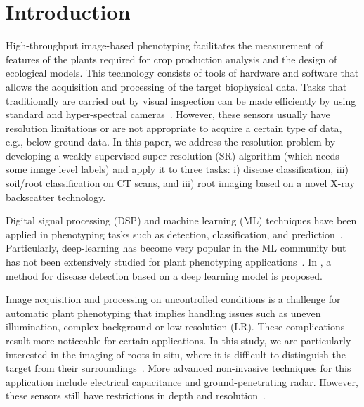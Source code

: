 \documentclass[10pt,twocolumn,letterpaper]{article}
\begin{document}
\section{Introduction}
High-throughput image-based phenotyping facilitates the measurement of features of the plants required for crop production analysis and the design of ecological models. This technology consists of tools of hardware and software that allows the acquisition and processing of the target biophysical data. Tasks that traditionally are carried out by visual inspection can be made efficiently by using standard and hyper-spectral cameras~\cite{Fahlgren2015}. However, these sensors usually have resolution limitations or are not appropriate to acquire a certain type of data, e.g., below-ground data. In this paper, we address the resolution problem by developing a weakly supervised super-resolution (SR) algorithm (which needs some image level labels) and apply it to three tasks:  i) disease classification, iii) soil/root classification on CT scans, and iii) root imaging based on a novel X-ray backscatter technology.


Digital signal processing (DSP) and machine learning (ML) techniques have been applied in phenotyping tasks such as detection, classification, and prediction~\cite{Singh2018}. Particularly, deep-learning has become very popular in the ML community but has not been extensively studied for plant phenotyping applications~\cite{Ubbens2017}. In \cite{Ramcharan2017}, a method for disease detection based on a deep learning model is proposed.

Image acquisition and processing on uncontrolled conditions is a challenge for automatic plant phenotyping that implies handling issues such as uneven illumination, complex background or low resolution (LR). These complications result more noticeable for certain applications. In this study, we are particularly interested in the imaging of roots in situ, where it is difficult to distinguish the target from their surroundings~\cite{Tabb2018}. More advanced non-invasive techniques for this application include electrical capacitance and ground-penetrating radar. However, these sensors still have restrictions in depth and resolution~\cite{Araus2014}.
\end{document}
